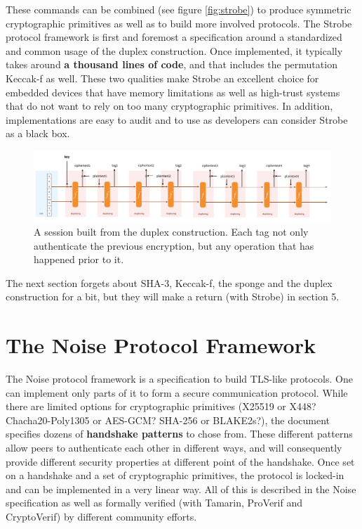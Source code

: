 \documentclass{article}
\begin{document}
These commands can be combined (see figure \ref{fig:strobe}) to produce symmetric cryptographic primitives as well as to build more involved protocols. The Strobe protocol framework is first and foremost a specification around a standardized and common usage of the duplex construction. Once implemented, it typically takes around \textbf{a thousand lines of code}, and that includes the permutation Keccak-f as well. These two qualities make Strobe an excellent choice for embedded devices that have memory limitations as well as high-trust systems that do not want to rely on too many cryptographic primitives. In addition, implementations are easy to audit and to use as developers can consider Strobe as a black box.

\begin{figure}[H]
\centering
\includegraphics[width=\textwidth]{rwcimg/session.png}
\caption{A session built from the duplex construction. Each tag not only authenticate the previous encryption, but any operation that has happened prior to it.}
\end{figure}

The next section forgets about SHA-3, Keccak-f, the sponge and the duplex construction for a bit, but they will make a return (with Strobe) in section 5.

\section{The Noise Protocol Framework}

The Noise protocol framework is a specification\cite{noise} to build TLS-like protocols. One can implement only parts of it to form a secure communication protocol. While there are limited options for cryptographic primitives (X25519 or X448? Chacha20-Poly1305 or AES-GCM? SHA-256 or BLAKE2s?), the document specifies dozens of \textbf{handshake patterns} to chose from. These different patterns allow peers to authenticate each other in different ways, and will consequently provide different security properties at different point of the handshake. Once set on a handshake and a set of cryptographic primitives, the protocol is locked-in and can be implemented in a very linear way. All of this is described in the Noise specification as well as formally verified (with Tamarin\cite{tamarin}, ProVerif\cite{noiseexplorer} and CryptoVerif\cite{cryptoverif}) by different community efforts.\\
\end{document}
